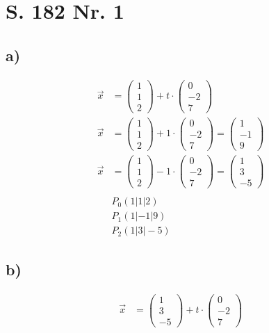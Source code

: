 \documentclass[12pt,a4paper]{report}
\begin{document}
	\section{S. 182 Nr. 1}
	\subsection{a)}
	\begin{align*}
		\overrightarrow x &= \begin{pmatrix}
			1 \\ 1 \\ 2
		\end{pmatrix}
		+ t \cdot \begin{pmatrix}
			0\\ -2 \\ 7
		\end{pmatrix} \\
		\overrightarrow x &= \begin{pmatrix}
			1 \\ 1 \\ 2
		\end{pmatrix}
		+ 1 \cdot \begin{pmatrix}
			0\\ -2 \\ 7
		\end{pmatrix} = \begin{pmatrix}
			1 \\ -1 \\ 9
		\end{pmatrix} \\
		\overrightarrow x &= \begin{pmatrix}
			1 \\ 1 \\ 2
		\end{pmatrix}
		- 1 \cdot \begin{pmatrix}
			0\\ -2 \\ 7
		\end{pmatrix} = \begin{pmatrix}
			1 \\ 3 \\ -5
		\end{pmatrix} \\\\
		&P_0(1|1|2) \\
		&P_1(1|-1|9) \\
		&P_2(1|3|-5)
	\end{align*}
	\subsection{b)}
	\begin{align*}
		\overrightarrow x &= \begin{pmatrix}
			1 \\ 3 \\ -5
		\end{pmatrix} + t \cdot \begin{pmatrix}
			0 \\ -2 \\ 7
		\end{pmatrix}
	\end{align*}
\end{document}
